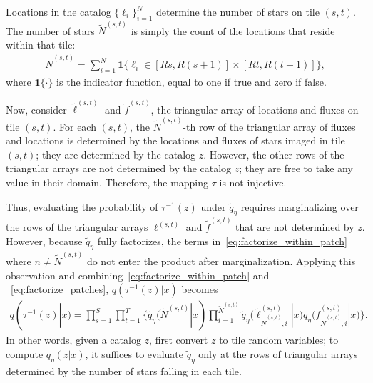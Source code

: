 Locations in the catalog $\{\ell_i\}_{i=1}^N$
determine the number of stars on tile $(s,t)$. 
The number of stars $\tilde N^{(s,t)}$ is simply the count of the locations that reside within that tile:
\begin{align}
\tilde N^{(s,t)} = \sum_{i=1}^N 
\mathbf 1 \Big\{\ell_i\in [Rs, R(s+1)] \times [Rt, R(t+1)]\Big\},
\end{align}
where $\mathbf{1}\{\cdot\}$ is the indicator function, equal to one if true and zero if false.

Now, consider $\tilde\ell^{(s, t)}$ and $\tilde f^{(s, t)}$, the triangular array of locations and fluxes on tile $(s,t)$. 
For each $(s,t)$, the $\tilde N^{(s,t)}$-th row 
of the triangular array of fluxes and locations is
determined by the locations and fluxes of stars imaged in tile $(s,t)$; they are determined by the catalog $z$. However, the other rows 
of the triangular arrays are not determined by 
the catalog $z$; they are free to take any value in their domain. Therefore, the mapping $\tau$ is not injective. 

Thus, evaluating the probability of $\tau^{-1}(z)$ under $\tilde q_\eta$ requires marginalizing over the rows of the triangular arrays $\ell^{(s, t)}$ and $\tilde f^{(s, t)}$ that are not determined by $z$. However, 
because $\tilde q_\eta$ fully factorizes, the terms 
in~\eqref{eq:factorize_within_patch} where $n \not= \tilde N^{(s,t)}$ do not enter the
product
after marginalization.
Applying this observation and combining~\eqref{eq:factorize_within_patch} and ~\eqref{eq:factorize_patches}, $\tilde q(\tau^{-1}(z) | x)$ becomes
\begin{align}
    \tilde q(\tau^{-1}(z) | x) = \prod_{s=1}^S\prod_{t=1}^T
    \Big\{
    \tilde q_\eta(\tilde N^{(s,t)} | x) 
    \prod_{i = 1}^{\tilde N^{(s,t)}}
    \tilde q_\eta\big(\tilde \ell_{\tilde N^{(s,t)},i}^{(s, t)} | x\big)
    \tilde q_\eta\big(\tilde f_{\tilde N^{(s,t)},i}^{(s, t)} | x\big)
    \Big\}.
\end{align}
In other words, given a catalog $z$,
first convert $z$ to tile random variables;
to compute $q_\eta(z | x)$, it suffices to evaluate $\tilde q_\eta$ only at the rows of triangular 
arrays determined by the number 
of stars falling in each tile. 


